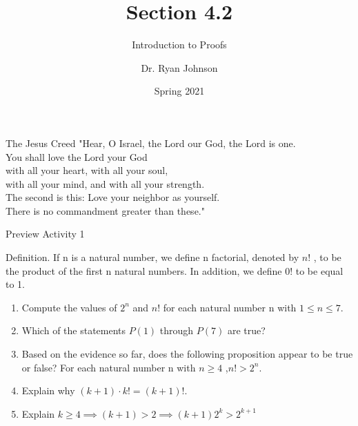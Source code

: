 \documentclass{beamer}
\title{Section 4.2}
\subtitle{Introduction to Proofs}
\author{Dr. Ryan Johnson}
\institute{Grace College}
\date{Spring 2021}
\begin{document}
\begin{frame}[plain]
    \maketitle
\end{frame}

\begin{frame}{The Jesus Creed}
\Large{
"Hear, O Israel, the Lord our God, the Lord is one.\\
You shall love the Lord your God\\
\;\; with all your heart, with all your soul,\\
\;\; with all your mind, and with all your strength.\\
The second is this: Love your neighbor as yourself.\\
There is no commandment greater than these."
}
\end{frame}

\begin{frame}{Preview Activity 1}
    \begin{definition}
    Definition. If n is a natural number, we define n factorial, denoted by $n!$ , to be the product of the first n natural numbers. In addition, we define $0!$ to be equal to 1.
    \end{definition}
    
    \begin{enumerate}
        \item Compute the values of $2^n$ and $n!$ for each natural number n with $1 \leq n \leq 7$. \pause
         \pause
        \item Which of the statements $P(1)$ through $P(7)$ are true? \pause
        \item Based on the evidence so far, does the following proposition appear to be true or false? For each natural number n with $n \geq 4$ ,$n! > 2^n$.
        \item Explain why $(k+1) \cdot k! = (k+1)!$.
        \item Explain $k \geq 4 \implies (k+1) > 2 \implies (k+1)2^k > 2^{k+1}$
    \end{enumerate}
\end{frame}
\end{document}
